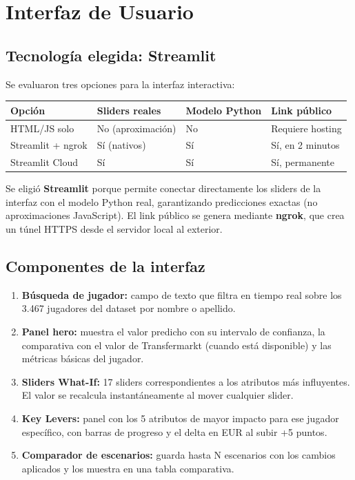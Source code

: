 \documentclass[12pt,a4paper]{report}
\begin{document}
\chapter{Interfaz de Usuario}

\section{Tecnología elegida: Streamlit}

Se evaluaron tres opciones para la interfaz interactiva:

\begin{center}
\begin{tabular}{llll}
\toprule
\textbf{Opción} & \textbf{Sliders reales} & \textbf{Modelo Python} & \textbf{Link público} \\
\midrule
HTML/JS solo      & No (aproximación)  & No & Requiere hosting \\
Streamlit + ngrok & Sí (nativos)       & Sí & Sí, en 2 minutos \\
Streamlit Cloud   & Sí                 & Sí & Sí, permanente \\
\bottomrule
\end{tabular}
\end{center}

Se eligió \textbf{Streamlit} porque permite conectar directamente los sliders de la interfaz con el modelo Python real, garantizando predicciones exactas (no aproximaciones JavaScript). El link público se genera mediante \textbf{ngrok}, que crea un túnel HTTPS desde el servidor local al exterior.

\section{Componentes de la interfaz}

\begin{enumerate}
  \item \textbf{Búsqueda de jugador:} campo de texto que filtra en tiempo real sobre los 3.467 jugadores del dataset por nombre o apellido.
  \item \textbf{Panel hero:} muestra el valor predicho con su intervalo de confianza, la comparativa con el valor de Transfermarkt (cuando está disponible) y las métricas básicas del jugador.
  \item \textbf{Sliders What-If:} 17 sliders correspondientes a los atributos más influyentes. El valor se recalcula instantáneamente al mover cualquier slider.
  \item \textbf{Key Levers:} panel con los 5 atributos de mayor impacto para ese jugador específico, con barras de progreso y el delta en EUR al subir +5 puntos.
  \item \textbf{Comparador de escenarios:} guarda hasta N escenarios con los cambios aplicados y los muestra en una tabla comparativa.
\end{enumerate}
\end{document}
